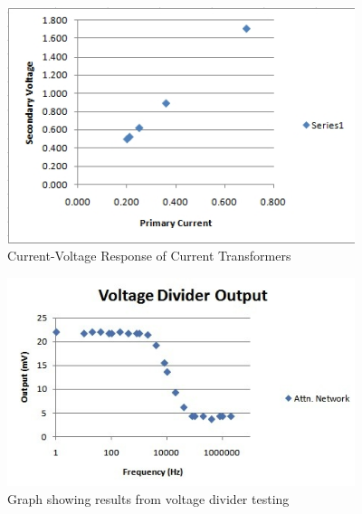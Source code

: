 \begin{figure}[htbp]
\begin{center}
\includegraphics[width=4in]{includes/NJGraph}
\caption{Current-Voltage Response of Current Transformers}
\label{fig:current_transformers_iv_response}
\end{center}
\end{figure}

\begin{figure}[htbp]
\begin{center}
\includegraphics[width=4in]{includes/NJVoltDivOutput}
\caption{Graph showing results from voltage divider testing}
\label{fig:voltage_divider_testing}
\end{center}
\end{figure}

